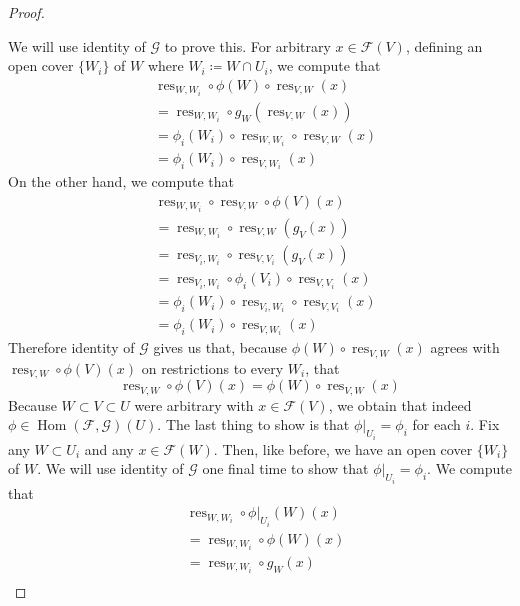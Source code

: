 \documentclass{article}
\newcommand{\fF}{\mathscr{F}}
\newcommand{\fG}{\mathscr{G}}
\DeclareMathOperator{\res}{\mathrm{res}}
\DeclareMathOperator{\Hom}{\mathrm{Hom}}
\begin{document}
\begin{proof}
    \begin{center}
    \end{center}
    We will use identity of $\fG$ to prove this. For arbitrary $x\in \fF(V)$, defining an open cover $\{W_i\}$ of $W$ where $W_i\coloneqq W\cap U_i$, we compute that
    \begin{align*}
        &\res_{W,W_i}\circ \phi(W)\circ \res_{V,W}(x)\\
        &=\res_{W,W_i}\circ g_W(\res_{V,W}(x))\\
        &=\phi_i(W_i)\circ \res_{W,W_i}\circ \res_{V,W}(x)\\
        &=\phi_i(W_i)\circ \res_{V,W_i}(x)
    \end{align*}
    On the other hand, we compute that
    \begin{align*}
        &\res_{W,W_i}\circ \res_{V,W}\circ \phi(V)(x)\\
        &=\res_{W,W_i}\circ \res_{V,W}(g_V(x))\\
        &=\res_{V_i,W_i}\circ\res_{V,V_i}(g_V(x))\\
        &=\res_{V_i,W_i}\circ \phi_i(V_i)\circ \res_{V,V_i}(x)\\
        &=\phi_i(W_i)\circ \res_{V_i,W_i}\circ \res_{V,V_i}(x)\\
        &=\phi_i(W_i)\circ \res_{V,W_i}(x)
    \end{align*}
    Therefore identity of $\fG$ gives us that, because $\phi(W)\circ \res_{V,W}(x)$ agrees with $\res_{V,W}\circ \phi(V)(x)$ on restrictions to every $W_i$, that
    \[
    \res_{V,W}\circ \phi(V)(x)=\phi(W)\circ \res_{V,W}(x)
    \]
    Because $W\subset V\subset U$ were arbitrary with $x\in \fF(V)$, we obtain that indeed $\phi\in \Hom(\fF,\fG)(U)$. The last thing to show is that $\phi\vert_{U_i}=\phi_i$ for each $i$. Fix any $W\subset U_i$ and any $x\in \fF(W)$. Then, like before, we have an open cover $\{W_i\}$ of $W$. We will use identity of $\fG$ one final time to show that $\phi\vert_{U_i}=\phi_i$. We compute that
    \begin{align*}
        &\res_{W,W_i}\circ \phi\vert_{U_i}(W)(x)\\
        &=\res_{W,W_i}\circ \phi(W)(x)\\
        &=\res_{W,W_i}\circ g_W(x)\\

\end{align*}
\end{proof}
\end{document}
